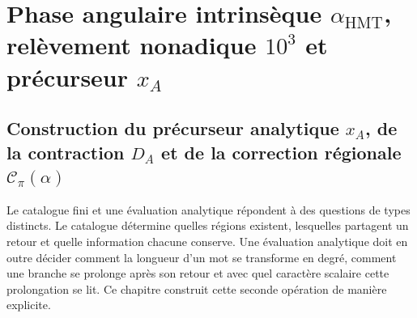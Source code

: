 
\label{chap:p3-83-30-angulo_contraangulo}

\label{p3-20260826:chap:realizacion-analitica-contraangulo}

\section{Phase angulaire intrinsèque \texorpdfstring{\(\alpha_{\mathrm{HMT}}\)}{alpha HMT}, relèvement nonadique \texorpdfstring{\(10^3\)}{10^3} et précurseur \texorpdfstring{\(x_A\)}{x_A}}
\label{sec:s102:c38:1}

\subsection{Construction du précurseur analytique \texorpdfstring{\(x_A\)}{x_A}, de la contraction \texorpdfstring{\(D_A\)}{D_A} et de la correction régionale \texorpdfstring{\(\mathscr C_\pi(\alpha)\)}{C_pi(alpha)}}
\label{sec:s102:c38:1:1}

\label{p3-83-c30-s1:chap:realizacion-analitica-contraangulo}

Le catalogue fini et une évaluation analytique répondent à des questions de types
distincts. Le catalogue détermine quelles régions existent, lesquelles partagent un
retour et quelle information chacune conserve. Une évaluation analytique doit
en outre décider comment la longueur d'un mot se transforme en degré, comment
une branche se prolonge après son retour et avec quel caractère scalaire cette
prolongation se lit. Ce chapitre construit cette seconde opération de manière
explicite.

